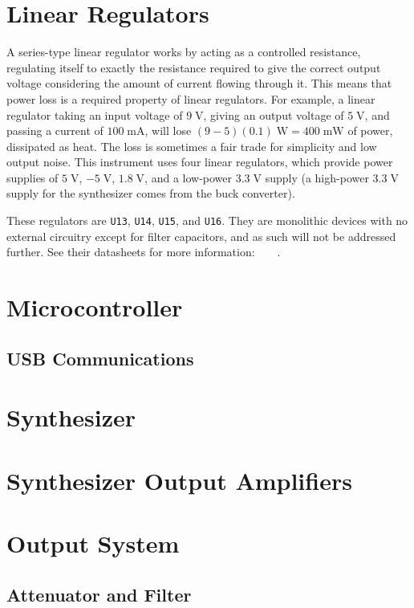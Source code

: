 \documentclass[article,oneside]{memoir}
\newcommand{\refdes}[1]{\texttt{#1}}
\newcommand{\mr}[1]{\ensuremath{\mathrm{#1}}}
\begin{document}
\begin{multicols}{2}
\section{Linear Regulators}
A series-type linear regulator works by acting as a controlled resistance,
regulating itself to exactly the resistance required to give the correct
output voltage considering the amount of current flowing through it. This
means that power loss is a required property of linear regulators. For example,
a linear regulator taking an input voltage of $9\;\mr{V}$, giving an output
voltage of $5\;\mr{V}$, and passing a current of $100\;\mr{mA}$, will
lose $(9-5)(0.1)\;\mr{W} = 400\;\mr{mW}$ of power, dissipated as heat.
The loss is sometimes a fair trade for simplicity and low output noise.
This instrument uses four linear regulators, which provide power supplies
of $5\;\mr{V}$, $-5\;\mr{V}$, $1.8\;\mr{V}$, and a low-power $3.3\;\mr{V}$
supply (a high-power $3.3\;\mr{V}$ supply for the synthesizer comes from
the buck converter).

These regulators are \refdes{U13}, \refdes{U14}, \refdes{U15}, and \refdes{U16}.
They are monolithic devices with no external circuitry except for filter
capacitors, and as such will not be addressed further. See their datasheets for
more information:~\cite{l78m05}~\cite{mc79m00}~\cite{az1117c}~\cite{mcp1700}.

\section{Microcontroller}
\subsection{USB Communications}

\section{Synthesizer}

\section{Synthesizer Output Amplifiers}

\section{Output System}

\subsection{Attenuator and Filter}

\end{multicols}
\end{document}
